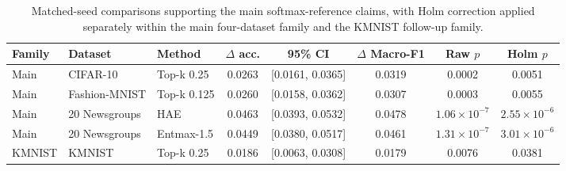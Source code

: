 \begin{table}[!t]
\centering
\small
\caption{Matched-seed comparisons supporting the main softmax-reference claims, with Holm correction applied separately within the main four-dataset family and the KMNIST follow-up family.}
\label{tab:paired-softmax}
\begin{tabular}{@{}lllccccc@{}}
\toprule
Family & Dataset & Method & $\Delta$ acc. & 95\% CI & $\Delta$ Macro-F1 & Raw $p$ & Holm $p$ \\
\midrule
Main & CIFAR-10 & Top-k 0.25 & 0.0263 & [0.0161, 0.0365] & 0.0319 & 0.0002 & 0.0051 \\
Main & Fashion-MNIST & Top-k 0.125 & 0.0260 & [0.0158, 0.0362] & 0.0307 & 0.0003 & 0.0055 \\
Main & 20 Newsgroups & HAE & 0.0463 & [0.0393, 0.0532] & 0.0478 & $1.06 \times 10^{-7}$ & $2.55 \times 10^{-6}$ \\
Main & 20 Newsgroups & Entmax-1.5 & 0.0449 & [0.0380, 0.0517] & 0.0461 & $1.31 \times 10^{-7}$ & $3.01 \times 10^{-6}$ \\
KMNIST & KMNIST & Top-k 0.25 & 0.0186 & [0.0063, 0.0308] & 0.0179 & 0.0076 & 0.0381 \\
\bottomrule
\end{tabular}
\end{table}
